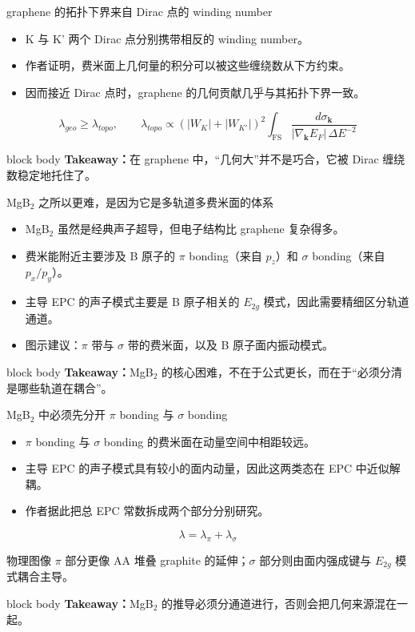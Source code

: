 \documentclass[aspectratio=169,11pt,UTF8]{ctexbeamer}
\newcommand{\takeaway}[1]{%
  \vfill
  \begin{beamercolorbox}[wd=\textwidth,sep=0.7ex,rounded=true]{block body}
    \small\textbf{Takeaway：}#1
  \end{beamercolorbox}
}
\begin{document}
\begin{frame}[fragile]{graphene 的拓扑下界来自 Dirac 点的 winding number}
  \begin{itemize}
    \item K 与 K' 两个 Dirac 点分别携带相反的 winding number。
    \item 作者证明，费米面上几何量的积分可以被这些缠绕数从下方约束。
    \item 因而接近 Dirac 点时，graphene 的几何贡献几乎与其拓扑下界一致。
  \end{itemize}
  \begin{equation*}
    \lambda_{geo} \ge \lambda_{topo},
    \qquad
    \lambda_{topo}
    \propto
    \left(|W_K|+|W_{K'}|\right)^2
    \int_{\mathrm{FS}}
    \frac{d\sigma_{\mathbf{k}}}{|\nabla_{\mathbf{k}}E_F|\,\Delta E^{-2}}
  \end{equation*}
  \takeaway{在 graphene 中，“几何大”并不是巧合，它被 Dirac 缠绕数稳定地托住了。}
\end{frame}

\begin{frame}[fragile]{MgB$_2$ 之所以更难，是因为它是多轨道多费米面的体系}
  \begin{itemize}
    \item MgB$_2$ 虽然是经典声子超导，但电子结构比 graphene 复杂得多。
    \item 费米能附近主要涉及 B 原子的 $\pi$ bonding（来自 $p_z$）和 $\sigma$ bonding（来自 $p_x/p_y$）。
    \item 主导 EPC 的声子模式主要是 B 原子相关的 $E_{2g}$ 模式，因此需要精细区分轨道通道。
  \item 图示建议：$\pi$ 带与 $\sigma$ 带的费米面，以及 B 原子面内振动模式。
  \end{itemize}
  \takeaway{MgB$_2$ 的核心困难，不在于公式更长，而在于“必须分清是哪些轨道在耦合”。}
\end{frame}

\begin{frame}[fragile]{MgB$_2$ 中必须先分开 $\pi$ bonding 与 $\sigma$ bonding}
  \begin{itemize}
    \item $\pi$ bonding 与 $\sigma$ bonding 的费米面在动量空间中相距较远。
    \item 主导 EPC 的声子模式具有较小的面内动量，因此这两类态在 EPC 中近似解耦。
    \item 作者据此把总 EPC 常数拆成两个部分分别研究。
  \end{itemize}
  \begin{equation*}
    \lambda = \lambda_{\pi} + \lambda_{\sigma}
  \end{equation*}
  \begin{block}{物理图像}
    $\pi$ 部分更像 AA 堆叠 graphite 的延伸；$\sigma$ 部分则由面内强成键与 $E_{2g}$ 模式耦合主导。
  \end{block}
  \takeaway{MgB$_2$ 的推导必须分通道进行，否则会把几何来源混在一起。}
\end{frame}
\end{document}
